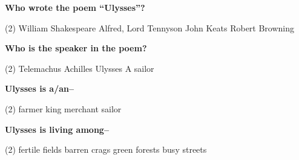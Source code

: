 \documentclass[12pt,a4paper]{exam}
\begin{document}
\begin{questions}


	\begin{minipage}{\textwidth}
		\question \textbf{Who wrote the poem ``Ulysses''?}

		\begin{tasks}(2)
			\task William Shakespeare
			\task Alfred, Lord Tennyson
			\task John Keats
			\task Robert Browning
		\end{tasks}
	\end{minipage}


	\begin{minipage}{\textwidth}
		\question \textbf{Who is the speaker in the poem?}

		\begin{tasks}(2)
			\task Telemachus
			\task Achilles
			\task Ulysses
			\task A sailor
		\end{tasks}
	\end{minipage}


	\begin{minipage}{\textwidth}
		\question \textbf{Ulysses is a/an--}

		\begin{tasks}(2)
			\task farmer
			\task king
			\task merchant
			\task sailor
		\end{tasks}
	\end{minipage}


	\begin{minipage}{\textwidth}
		\question \textbf{Ulysses is living among--}

		\begin{tasks}(2)
			\task fertile fields
			\task barren crags
			\task green forests
			\task busy streets
		\end{tasks}
	\end{minipage}



\end{questions}
\end{document}
